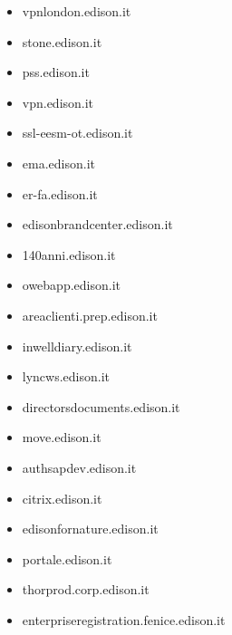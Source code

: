 \documentclass{article}
\begin{document}
\begin{itemize}
            \item vpnlondon.edison.it
        
            \item stone.edison.it
        
            \item pss.edison.it
        
            \item vpn.edison.it
        
            \item ssl-eesm-ot.edison.it
        
            \item ema.edison.it
        
            \item er-fa.edison.it
        
            \item edisonbrandcenter.edison.it
        
            \item 140anni.edison.it
        
            \item owebapp.edison.it
        
            \item areaclienti.prep.edison.it
        
            \item inwelldiary.edison.it
        
            \item lyncws.edison.it
        
            \item directorsdocuments.edison.it
        
            \item move.edison.it
        
            \item authsapdev.edison.it
        
            \item citrix.edison.it
        
            \item edisonfornature.edison.it
        
            \item portale.edison.it
        
            \item thorprod.corp.edison.it
        
            \item enterpriseregistration.fenice.edison.it
        

\end{itemize}
\end{document}
